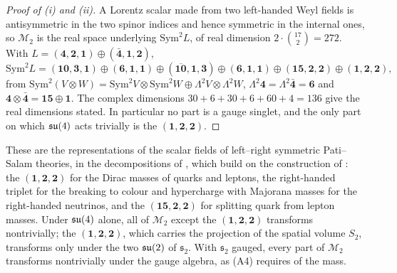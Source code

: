\begin{proof}[Proof of (i) and (ii)]
A Lorentz scalar made from two left-handed Weyl fields is antisymmetric in the two spinor indices and hence symmetric in the internal ones,
so $\mathcal M_2$ is the real space underlying $\mathrm{Sym}^2L$, of real dimension $2\cdot\binom{17}2=272$. With
$L=(\mathbf4,\mathbf2,\mathbf1)\oplus(\bar{\mathbf4},\mathbf1,\mathbf2)$,
\[
\mathrm{Sym}^2L=(\mathbf{10},\mathbf3,\mathbf1)\oplus(\mathbf6,\mathbf1,\mathbf1)\oplus(\overline{\mathbf{10}},\mathbf1,\mathbf3)\oplus
(\mathbf6,\mathbf1,\mathbf1)\oplus(\mathbf{15},\mathbf2,\mathbf2)\oplus(\mathbf1,\mathbf2,\mathbf2),
\]
from $\mathrm{Sym}^2(V\otimes W)=\mathrm{Sym}^2V\otimes\mathrm{Sym}^2W\oplus\Lambda^2V\otimes\Lambda^2W$, $\Lambda^2\mathbf4=\Lambda^2\bar{\mathbf4}=\mathbf6$
and $\mathbf4\otimes\bar{\mathbf4}=\mathbf{15}\oplus\mathbf1$. The complex dimensions $30+6+30+6+60+4=136$ give the real dimensions stated.
In particular no part is a gauge singlet, and the only part on which $\mathfrak{su}(4)$ acts trivially is the $(\mathbf1,\mathbf2,\mathbf2)$.
\end{proof}

These are the representations of the scalar fields of left--right symmetric Pati--Salam theories, in the decompositions of
\cite[eqs.~(3.5)--(3.7)]{DingKingLu2021}, which build on the construction of \cite{PatiSalam}: the
$(\mathbf1,\mathbf2,\mathbf2)$ for the Dirac masses of quarks and leptons, the right-handed triplet for the breaking to colour and
hypercharge with Majorana masses for the right-handed neutrinos, and the $(\mathbf{15},\mathbf2,\mathbf2)$ for splitting quark from lepton
masses. Under $\mathfrak{su}(4)$ alone, all of $\mathcal M_2$ except the $(\mathbf1,\mathbf2,\mathbf2)$ transforms nontrivially; the
$(\mathbf1,\mathbf2,\mathbf2)$, which carries the projection of the spatial volume $S_2$, transforms only under the two $\mathfrak{su}(2)$ of
$\mathfrak s_2$. With $\mathfrak s_2$ gauged, every part of $\mathcal M_2$ transforms nontrivially under the gauge algebra, as (A4) requires of
the mass.

